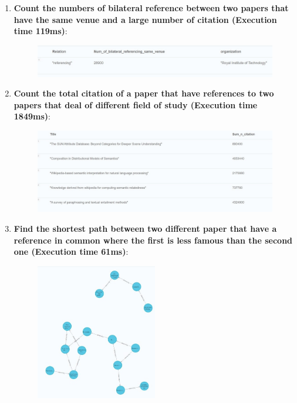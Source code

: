 \documentclass{Configuration_Files/PoliMi3i_thesis}
\begin{document}
\begin{enumerate}
\begin{figure}[H]
    \end{figure}
    \item \textbf{Count the numbers of bilateral reference between two papers that have the same venue and a large  number of citation (Execution time 119ms)}:
    
    \begin{figure}[H]
    \centering
    \includegraphics[width=\textwidth]{Images/queries/query_7.jpg}
    \end{figure}
    \item \textbf{Count the total citation of a paper that have references to two papers that deal of different field of study (Execution time 1849ms)}:
    
    \begin{figure}[H]
    \centering
    \includegraphics[width=\textwidth]{Images/queries/query_8.jpg}
    \end{figure}
    \item \textbf{Find the shortest path between two different paper that have a reference in common where the first is less famous than the second one (Execution time 61ms)}:
    
    \begin{figure}[H]
    \centering
    \includegraphics[width=0.5\textwidth]{Images/queries/query_9.jpg}

\end{figure}
\end{enumerate}
\end{document}
